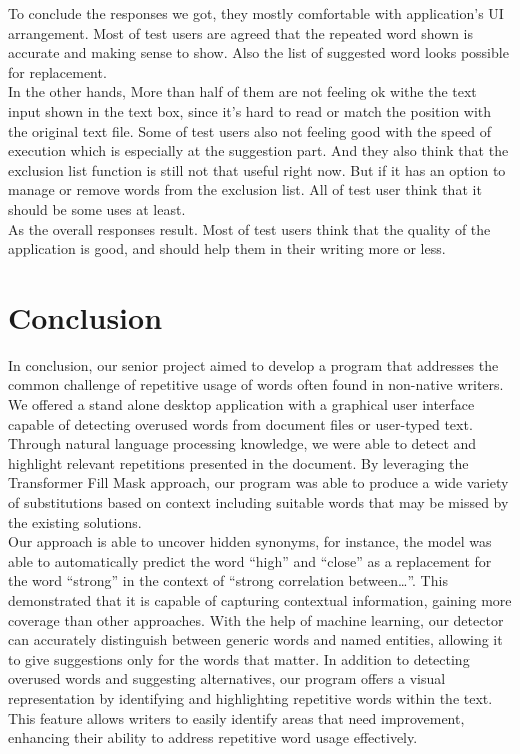 \documentclass[12pt,oneside,openright,a4paper]{cpe-english-project}
\begin{document}
To conclude the responses we got, they mostly comfortable with application’s UI arrangement. Most of test users are agreed that the repeated word shown is accurate and making sense to show. Also the list of suggested word looks possible for replacement. \\

In the other hands, More than half of them are not feeling ok withe the text input shown in the text box, since it’s hard to read or match the position with the original text file. Some of test users also not feeling good with the speed of execution which is especially at the suggestion part. And they also think that the exclusion list function is still not that useful right now. But if it has an option to manage or remove words from the exclusion list. All of test user think that it should be some uses at least. \\

As the overall responses result. Most of test users think that the quality of the application is good, and should help them in their writing more or less.


\chapter{Conclusion}

In conclusion, our senior project aimed to develop a program that addresses the common challenge of repetitive usage of words often found in non-native writers. We offered a stand alone desktop application with a graphical user interface capable of detecting overused words from document files or user-typed text. Through natural language processing knowledge, we were able to detect and highlight relevant repetitions presented in the document. By leveraging the Transformer Fill Mask approach, our program was able to produce a wide variety of substitutions based on context including suitable words that may be missed by the existing solutions.\\

Our approach is able to uncover hidden synonyms, for instance,  the model was able to automatically predict the word “high” and “close” as a replacement for the word “strong” in the context of “strong correlation between…”. This demonstrated that it is capable of capturing contextual information, gaining more coverage than other approaches.
With the help of machine learning, our detector can accurately distinguish between generic words and named entities, allowing it to give suggestions only for the words that matter. In addition to detecting overused words and suggesting alternatives, our program offers a visual representation by identifying and highlighting repetitive words within the text. This feature allows writers to easily identify areas that need improvement, enhancing their ability to address repetitive word usage effectively.\\
\end{document}
